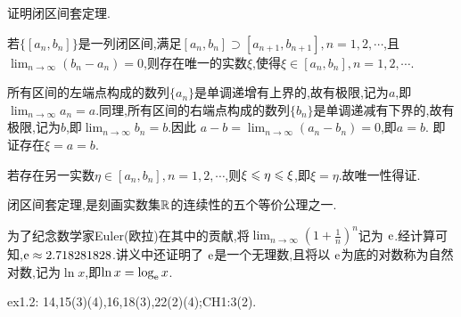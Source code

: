 \begin{example}
    证明闭区间套定理.

    \begin{theorem}[闭区间套定理]
        若$\{[a_n,b_n]\}$是一列闭区间,满足$[a_n,b_n]\supset[a_{n+1},b_{n+1}],n=1,2,\cdots$,且$\lim_{n \to \infty} (b_n-a_n)=0$,则存在唯一的实数$\xi$,使得$\xi \in [a_n,b_n],n=1,2,\cdots$.
    \end{theorem}

    所有区间的左端点构成的数列$\{a_n\}$是单调递增有上界的,故有极限,记为$a$,即$\lim_{n \to \infty} a_n = a$.同理,所有区间的右端点构成的数列$\{b_n\}$是单调递减有下界的,故有极限,记为$b$,即$\lim_{n \to \infty} b_n = b$.因此 $a-b = \lim_{n \to \infty} (a_n - b_n) = 0$,即$a=b$.
    即证存在$\xi = a = b$.

    若存在另一实数$\eta \in [a_n,b_n],n=1,2,\cdots$,则$\xi \leqslant \eta \leqslant \xi$,即$\xi = \eta$.故唯一性得证.
\end{example}

\begin{remark}
    闭区间套定理,是刻画实数集$\mathbb{R}$的连续性的五个等价公理之一.
\end{remark}

为了纪念数学家Euler(欧拉)在其中的贡献,将$\lim_{n \to \infty} (1+\frac 1n )^n $记为 $\mathrm{e}$.经计算可知,$\mathrm{e} \approx 2.718281828$.讲义中还证明了 $\mathrm{e}$是一个无理数,且将以 $\mathrm{e}$为底的对数称为自然对数,记为$\ln x$,即$\ln x = \log_{\mathrm{e}} x$.

\begin{homework}
ex1.2: 14,15(3)(4),16,18(3),22(2)(4);CH1:3(2).
\end{homework}
